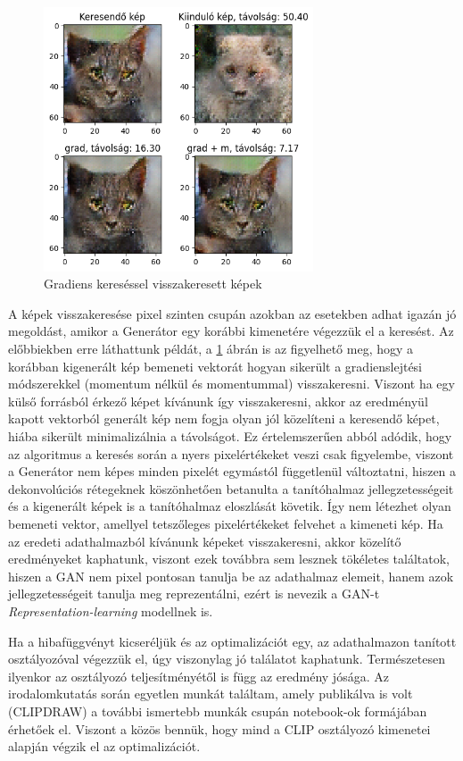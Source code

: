 \begin{figure}[h]
\centering
\includegraphics[width=8cm]{images/grad_found.png}
\caption{Gradiens kereséssel visszakeresett képek}
\label{fig:gradfound}
\end{figure}

A képek visszakeresése pixel szinten csupán azokban az esetekben adhat igazán jó megoldást, amikor a Generátor egy korábbi kimenetére végezzük el a keresést. Az előbbiekben erre láthattunk példát, a \ref{fig:gradfound} ábrán is az figyelhető meg, hogy a korábban kigenerált kép bemeneti vektorát hogyan sikerült a gradienslejtési módszerekkel (momentum nélkül és momentummal) visszakeresni.
Viszont ha egy külső forrásból érkező képet kívánunk így visszakeresni, akkor az eredményül kapott vektorból generált kép nem fogja olyan jól közelíteni a keresendő képet, hiába sikerült minimalizálnia a távolságot.
Ez értelemszerűen abból adódik, hogy az algoritmus a keresés során a nyers pixelértékeket veszi csak figyelembe, viszont a Generátor nem képes minden pixelét egymástól függetlenül változtatni, hiszen a dekonvolúciós rétegeknek köszönhetően betanulta a tanítóhalmaz jellegzetességeit és a kigenerált képek is a tanítóhalmaz eloszlását követik. Így nem létezhet olyan bemeneti vektor, amellyel tetszőleges pixelértékeket felvehet a kimeneti kép.
Ha az eredeti adathalmazból  kívánunk képeket visszakeresni, akkor közelítő eredményeket kaphatunk, viszont ezek továbbra sem lesznek tökéletes találtatok, hiszen a GAN nem pixel pontosan tanulja be az adathalmaz elemeit, hanem azok jellegzetességeit tanulja meg reprezentálni, ezért is nevezik a GAN-t \textit{Representation-learning} \cite{geron2019hands} modellnek is.

Ha a hibafüggvényt kicseréljük és az optimalizációt egy, az adathalmazon tanított osztályozóval végezzük el, úgy viszonylag jó találatot kaphatunk. Természetesen ilyenkor az osztályozó teljesítményétől is függ az eredmény jósága.
Az irodalomkutatás során egyetlen munkát találtam, amely publikálva is volt (CLIPDRAW\cite{frans2021clipdraw}) a további ismertebb munkák csupán notebook-ok formájában érhetőek el. Viszont a közös bennük, hogy mind a CLIP\cite{radford2021learning} osztályozó kimenetei alapján végzik el az optimalizációt.

